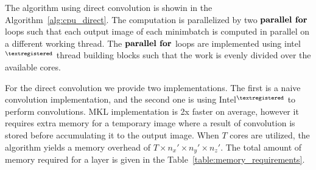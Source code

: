 \documentclass[conference]{IEEEtran}
\begin{document}
  The algorithm using direct convolution is showin in the
  Algorithm~\ref{alg:cpu_direct}.  The computation is parallelized by
  two $\textbf{parallel for}$ loops such that each output image of each
  minimbatch is computed in parallel on a different working thread.
  The $\textbf{parallel for}$ loops are implemented using intel$^{\small
    \textregistered}$ thread building blocks such that the work is
  evenly divided over the available cores.

  For the direct convolution we provide two implementations.  The
  first is a naive convolution implementation, and the second one is
  using Intel$^{\small \textregistered}$ to perform convolutions.  MKL
  implementation is 2x faster on average, however it requires extra
  memory for a temporary image where a result of convolution is stored
  before accumulating it to the output image.  When $T$ cores are
  utilized, the algorithm yields a memory overhead of $T \times n_x'
  \times n_y' \times n_z'$.  The total amount of memory required for a
  layer is given in the Table~\ref{table:memory_requirements}.
\end{document}
